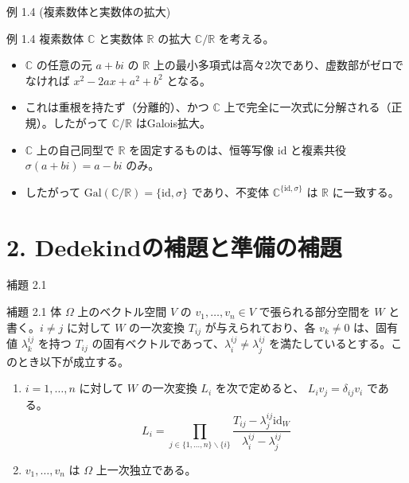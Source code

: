 \documentclass[aspectratio=169,11pt,unicode]{beamer}
\begin{document}
\begin{frame}{例 1.4 (複素数体と実数体の拡大)}
\begin{block}{例 1.4}
複素数体 $\mathbb{C}$ と実数体 $\mathbb{R}$ の拡大 $\mathbb{C}/\mathbb{R}$ を考える。
\begin{itemize}
    \item $\mathbb{C}$ の任意の元 $a+bi$ の $\mathbb{R}$ 上の最小多項式は高々2次であり、虚数部がゼロでなければ $x^2 - 2ax + a^2 + b^2$ となる。
    \item これは重根を持たず（分離的）、かつ $\mathbb{C}$ 上で完全に一次式に分解される（正規）。したがって $\mathbb{C}/\mathbb{R}$ はGalois拡大。
    \item $\mathbb{C}$ 上の自己同型で $\mathbb{R}$ を固定するものは、恒等写像 $\mathrm{id}$ と複素共役 $\sigma(a+bi) = a-bi$ のみ。
    \item したがって $\mathrm{Gal}(\mathbb{C}/\mathbb{R}) = \{\mathrm{id}, \sigma\}$ であり、不変体 $\mathbb{C}^{\{\mathrm{id}, \sigma\}}$ は $\mathbb{R}$ に一致する。
\end{itemize}
\end{block}
\end{frame}

\section{2. Dedekindの補題と準備の補題}

\begin{frame}{補題 2.1}
\begin{block}{補題 2.1}
体 $\Omega$ 上のベクトル空間 $V$ の $v_1, \dots, v_n \in V$ で張られる部分空間を $W$ と書く。$i \neq j$ に対して $W$ の一次変換 $T_{ij}$ が与えられており、各 $v_k \neq 0$ は、固有値 $\lambda^{ij}_k$ を持つ $T_{ij}$ の固有ベクトルであって、$\lambda^{ij}_i \neq \lambda^{ij}_j$ を満たしているとする。このとき以下が成立する。
\begin{enumerate}
    \item $i=1,\dots,n$ に対して $W$ の一次変換 $L_i$ を次で定めると、 $L_i v_j = \delta_{ij} v_i$ である。
    \[ L_i = \prod_{j \in \{1,\dots,n\} \smallsetminus \{i\}} \frac{T_{ij} - \lambda^{ij}_j \mathrm{id}_W}{\lambda^{ij}_i - \lambda^{ij}_j} \]
    \item $v_1, \dots, v_n$ は $\Omega$ 上一次独立である。
\end{enumerate}
\end{block}
\end{frame}
\end{document}
